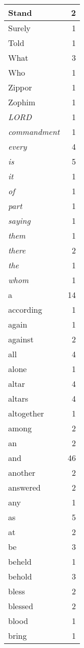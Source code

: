 \begin{center}
\begin{longtable}{l|r}
Stand & 2\\ \hline 
Surely & 1\\ \hline 
Told & 1\\ \hline 
What & 3\\ \hline 
Who & 1\\ \hline 
Zippor & 1\\ \hline 
Zophim & 1\\ \hline 
\emph{LORD} & 1\\ \hline 
\emph{commandment} & 1\\ \hline 
\emph{every} & 4\\ \hline 
\emph{is} & 5\\ \hline 
\emph{it} & 1\\ \hline 
\emph{of} & 1\\ \hline 
\emph{part} & 1\\ \hline 
\emph{saying} & 1\\ \hline 
\emph{them} & 1\\ \hline 
\emph{there} & 2\\ \hline 
\emph{the} & 1\\ \hline 
\emph{whom} & 1\\ \hline 
a & 14\\ \hline 
according & 1\\ \hline 
again & 1\\ \hline 
against & 2\\ \hline 
all & 4\\ \hline 
alone & 1\\ \hline 
altar & 4\\ \hline 
altars & 4\\ \hline 
altogether & 1\\ \hline 
among & 2\\ \hline 
an & 2\\ \hline 
and & 46\\ \hline 
another & 2\\ \hline 
answered & 2\\ \hline 
any & 1\\ \hline 
as & 5\\ \hline 
at & 2\\ \hline 
be & 3\\ \hline 
beheld & 1\\ \hline 
behold & 3\\ \hline 
bless & 2\\ \hline 
blessed & 2\\ \hline 
blood & 1\\ \hline 
bring & 1\\ \hline 

\end{longtable}
\end{center}
